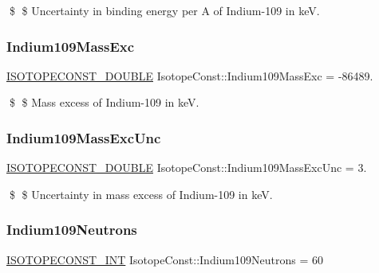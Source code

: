 \$ \$ Uncertainty in binding energy per A of Indium-\/109 in keV. \mbox{\label{group___isotope_const-_indium-_in109_gaa68036ab661243d4feb0e171f0ed88ad}} 
\subsubsection{\texorpdfstring{Indium109\+Mass\+Exc}{Indium109MassExc}}
{\footnotesize\ttfamily \mbox{\hyperlink{group___isotope_const-_macros_ga8f45a7272ce02c0b4c65c44636ed719a}{I\+S\+O\+T\+O\+P\+E\+C\+O\+N\+S\+T\+\_\+\+D\+O\+U\+B\+LE}} Isotope\+Const\+::\+Indium109\+Mass\+Exc = -\/86489.}

\$ \$ Mass excess of Indium-\/109 in keV. \mbox{\label{group___isotope_const-_indium-_in109_ga5fc474d838702fcb4770a546ab21819f}} 
\subsubsection{\texorpdfstring{Indium109\+Mass\+Exc\+Unc}{Indium109MassExcUnc}}
{\footnotesize\ttfamily \mbox{\hyperlink{group___isotope_const-_macros_ga8f45a7272ce02c0b4c65c44636ed719a}{I\+S\+O\+T\+O\+P\+E\+C\+O\+N\+S\+T\+\_\+\+D\+O\+U\+B\+LE}} Isotope\+Const\+::\+Indium109\+Mass\+Exc\+Unc = 3.}

\$ \$ Uncertainty in mass excess of Indium-\/109 in keV. \mbox{\label{group___isotope_const-_indium-_in109_ga8c347308f5d0601cc16dc72c658784fb}} 
\subsubsection{\texorpdfstring{Indium109\+Neutrons}{Indium109Neutrons}}
{\footnotesize\ttfamily \mbox{\hyperlink{group___isotope_const-_macros_ga5f18360b3e99483a35c32d789e62621c}{I\+S\+O\+T\+O\+P\+E\+C\+O\+N\+S\+T\+\_\+\+I\+NT}} Isotope\+Const\+::\+Indium109\+Neutrons = 60}

